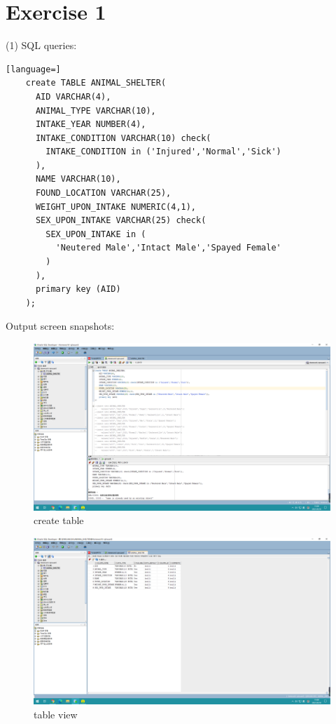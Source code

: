 \documentclass[]{article}
\title{}
\author{}
\date{}
\begin{document}

\section{Exercise 1}

(1) SQL queries:
	\begin{lstlisting}[language=] 
	create TABLE ANIMAL_SHELTER(
	  AID VARCHAR(4),
	  ANIMAL_TYPE VARCHAR(10),
	  INTAKE_YEAR NUMBER(4),
	  INTAKE_CONDITION VARCHAR(10) check(
	 	INTAKE_CONDITION in ('Injured','Normal','Sick')
	  ),
	  NAME VARCHAR(10),
	  FOUND_LOCATION VARCHAR(25),
	  WEIGHT_UPON_INTAKE NUMERIC(4,1),
	  SEX_UPON_INTAKE VARCHAR(25) check(
	 	SEX_UPON_INTAKE in (
	 	  'Neutered Male','Intact Male','Spayed Female'
	 	)
	  ),
	  primary key (AID)
	);
	\end{lstlisting} 
	Output screen snapshots:
	\begin{figure}[H]
		\centering
		\includegraphics[width=1.0\linewidth]{./document-H1/exercise1/1.1-1}
		\caption{create table}
		\label{1.1-1}
	\end{figure}
	\begin{figure}[H]
		\centering
		\includegraphics[width=1.0\linewidth]{./document-H1/exercise1/1.1-2}
		\caption{table view}
		\label{1.1-2}
	\end{figure}
\end{document}
